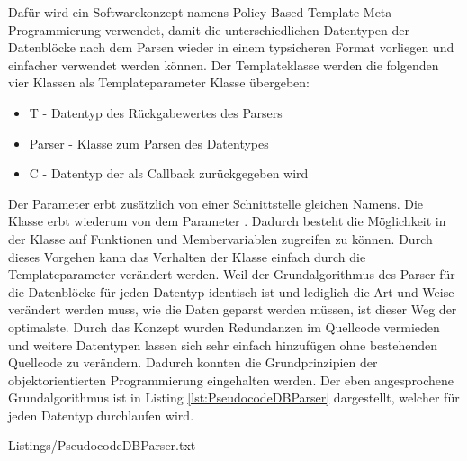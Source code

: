 Daf{\"u}r wird ein Softwarekonzept namens Policy-Based-Template-Meta Programmierung
 verwendet, damit die unterschiedlichen Datentypen der
Datenbl{\"o}cke nach dem Parsen wieder in einem typsicheren Format vorliegen und
einfacher verwendet werden k{\"o}nnen.
Der Templateklasse werden die folgenden vier Klassen als Templateparameter
Klasse {\"u}bergeben:

\begin{itemize}
\item T - Datentyp des R{\"u}ckgabewertes des Parsers
\item Parser - Klasse zum Parsen des Datentypes
\item C - Datentyp der als Callback zur{\"u}ckgegeben wird
\end{itemize}

Der Parameter  erbt zus{\"a}tzlich von einer
Schnittstelle gleichen Namens. Die Klasse  erbt
wiederum von dem Parameter .
Dadurch besteht die M{\"o}glichkeit in der Klasse auf Funktionen und
Membervariablen zugreifen zu k{\"o}nnen.
Durch dieses Vorgehen kann das Verhalten der Klasse einfach durch die
Templateparameter ver{\"a}ndert werden. Weil der Grundalgorithmus des Parser f{\"u}r
die Datenbl{\"o}cke f{\"u}r jeden Datentyp identisch ist und lediglich die Art und
Weise ver{\"a}ndert werden muss, wie die Daten geparst werden m{\"u}ssen,
ist dieser Weg der optimalste. Durch das Konzept wurden
Redundanzen im Quellcode vermieden und weitere Datentypen lassen sich
sehr einfach hinzuf{\"u}gen ohne bestehenden Quellcode zu ver{\"a}ndern. Dadurch konnten
die Grundprinzipien der objektorientierten Programmierung 
eingehalten werden.
Der eben angesprochene Grundalgorithmus ist in Listing 
\ref{lst:PseudocodeDBParser} dargestellt, welcher f{\"u}r jeden Datentyp
durchlaufen wird.

\lstset{language=pseudo}
\lstset{commentstyle=\textit}
{Listings/PseudocodeDBParser.txt}
